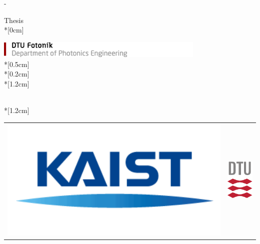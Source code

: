 \thispagestyle{empty}             %
\calccentering{\unitlength}
\begin{adjustwidth*}{\unitlength}{-\unitlength}
    \begin{adjustwidth}{-0.5cm}{-0.5cm}
        \sffamily
        \begin{flushright}
            \thesistypeabbr{} Thesis\\*[0cm]
            \thesistype{}\\
        \end{flushright}
        \vspace*{\fill}
        \noindent
        \includegraphics[width=0.75\textwidth]{Graphic/Titlepage/DTU Fotonik}\\*[0.5cm]
        \HUGE \thesistitle{}\\*[0.2cm]
        \Large \thesissubtitle{}\\*[1.2cm]
        \parbox[b]{0.7\linewidth}{%
            \Large
            \thesisauthor{}\\*[1.2cm]
            \Large
            \thesislocation{} \the\year
        }
        \hfill\begin{tabular}{cc}
            \includegraphics[scale=0.2]{Graphic/Titlepage/KAIST Logo} \hspace{0.1cm} & \includegraphics[scale=0.7]{Graphic/Titlepage/DTU Logo}
        \end{tabular}
    \end{adjustwidth}
\end{adjustwidth*}
\normalfont
\normalsize
